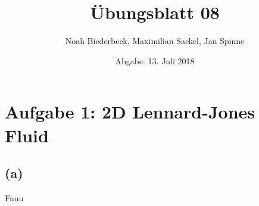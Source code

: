 \documentclass{scrartcl}
\title{Übungsblatt 08}
\author{%
		Noah Biederbeck, Maximilian Sackel, Jan Spinne
}
\date{Abgabe: 13. Juli 2018}
\begin{document}
\maketitle
\section*{Aufgabe 1: 2D Lennard-Jones Fluid}
\subsection*{(a)}
Fuuu
\end{document}
